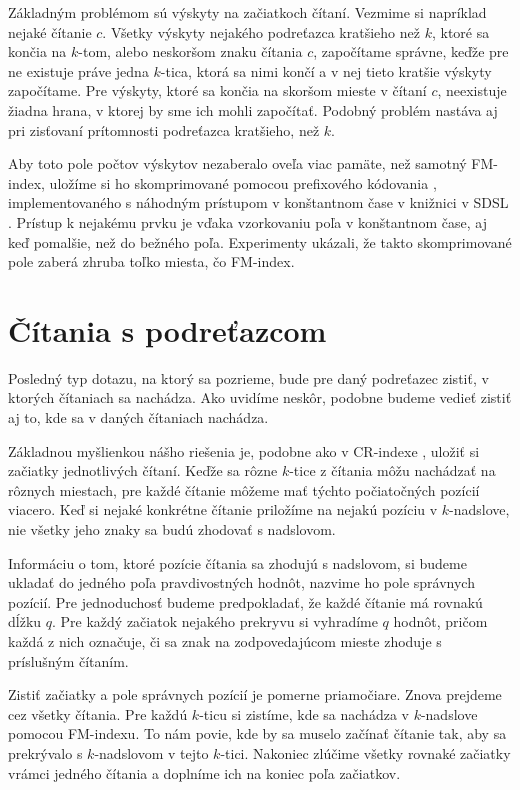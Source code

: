 Základným problémom sú výskyty na začiatkoch čítaní. Vezmime si napríklad nejaké čítanie $c$.
Všetky výskyty nejakého podreťazca kratšieho než $k$, ktoré sa končia na $k$-tom, alebo
neskoršom znaku čítania $c$, započítame správne, keďže pre ne existuje práve jedna $k$-tica,
ktorá sa nimi končí a v nej tieto kratšie výskyty započítame. Pre výskyty, ktoré sa končia
na skoršom mieste v čítaní $c$, neexistuje žiadna hrana, v ktorej by sme ich mohli
započítať. Podobný problém nastáva aj pri zisťovaní prítomnosti podreťazca kratšieho, než $k$.

Aby toto pole počtov výskytov nezaberalo oveľa viac pamäte, než samotný FM-index, uložíme
si ho skomprimované pomocou prefixového kódovania \cite{integer_coding}, implementovaného
s náhodným prístupom v konštantnom čase v knižnici v SDSL \cite{sdsl}. Prístup k nejakému
prvku je vďaka vzorkovaniu poľa v konštantnom čase, aj keď pomalšie, než do bežného poľa.
Experimenty ukázali, že takto skomprimované pole zaberá zhruba toľko miesta,
čo FM-index.

\section{Čítania s podreťazcom}
\label{sekcia:index_ktore}

Posledný typ dotazu, na ktorý sa pozrieme, bude pre daný podreťazec zistiť, v
ktorých čítaniach sa nachádza. Ako uvidíme neskôr, podobne budeme vedieť zistiť
aj to, kde sa v daných čítaniach nachádza.

Základnou myšlienkou nášho riešenia je, podobne ako v CR-indexe \cite{cr_index}, uložiť si
začiatky jednotlivých čítaní. Keďže sa rôzne $k$-tice z čítania môžu nachádzať
na rôznych miestach, pre každé čítanie môžeme mať týchto počiatočných pozícií viacero.
Keď si nejaké konkrétne čítanie priložíme na nejakú pozíciu v $k$-nadslove,
nie všetky jeho znaky sa budú zhodovať s nadslovom.

Informáciu o tom, ktoré pozície čítania sa zhodujú s nadslovom, si budeme ukladať
do jedného poľa pravdivostných hodnôt, nazvime ho pole správnych pozícií. Pre jednoduchosť budeme predpokladať, že
každé čítanie má rovnakú dĺžku $q$. Pre každý začiatok nejakého prekryvu si
vyhradíme $q$ hodnôt, pričom každá z nich označuje, či sa znak na zodpovedajúcom mieste zhoduje s príslušným čítaním.

Zistiť začiatky a pole správnych pozícií je pomerne priamočiare. Znova prejdeme cez všetky čítania. 
Pre každú $k$-ticu si zistíme, kde sa nachádza v $k$-nadslove pomocou FM-indexu.
To nám povie, kde by sa muselo začínať čítanie tak, aby sa prekrývalo s $k$-nadslovom
v tejto $k$-tici. Nakoniec zlúčime všetky rovnaké začiatky vrámci jedného čítania a
doplníme ich na koniec poľa začiatkov.

